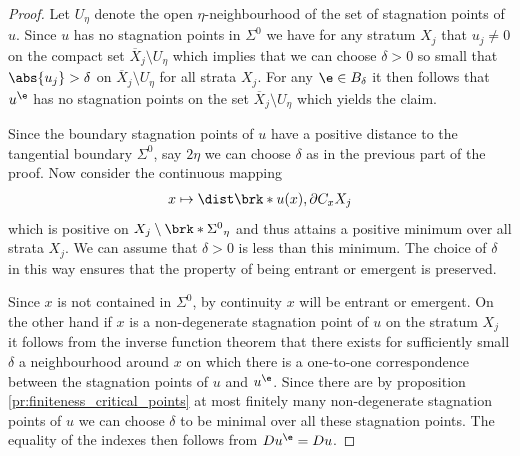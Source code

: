 \begin{proof}
  Let $U_\eta$ denote the open $\eta$-neighbourhood of the set of stagnation points of $u$.
  Since $u$ has no stagnation points in $\Sigma^0$ we have for any stratum $X_j$ that
  $u_j\neq0$ on the compact set $\overline{X}_j\setminus U_\eta$ which implies that we can choose $\delta>0$ 
  so small that $\abs{u_j}>\delta$ on $\overline{X}_j\setminus U_\eta$
  for all strata $X_j$.
  For any $\e\in B_\delta$ it then follows that $u^\e$ has no stagnation points on the set $\overline{X}_j\setminus U_\eta$
  which yields the claim.

  Since the boundary stagnation points of $u$ have a positive distance to the tangential boundary $\Sigma^0$,
  say $2\eta$ we can choose $\delta$ as in the previous part of the proof. Now consider the continuous mapping
  \begin{align*}
    x\mapsto \dist\brk*{u(x),\partial C_xX_j}
  \end{align*}
  which is positive on $X_j\setminus \brk*{\Sigma^0}_\eta$ and thus attains a positive minimum over all strata $X_j$.
  We can assume that $\delta>0$ is less than this minimum.
  The choice of $\delta$ in this way ensures that the property of being entrant or emergent is preserved.

  Since $x$ is not contained in $\Sigma^0$, by continuity $x$ will
  be entrant or emergent.
  On the other hand if $x$ is a non-degenerate stagnation point of $u$ on the stratum $X_j$ it follows 
  from the inverse function theorem that there exists for sufficiently small $\delta$
  a neighbourhood around $x$ on which there is a one-to-one correspondence between the
  stagnation points of $u$ and $u^\e$.
  Since there are by proposition \ref{pr:finiteness_critical_points} at most finitely many non-degenerate stagnation points of
  $u$ we can choose $\delta$ to be minimal over all these stagnation points.
  The equality of the indexes then follows from $Du^\e=Du$.

\end{proof}


